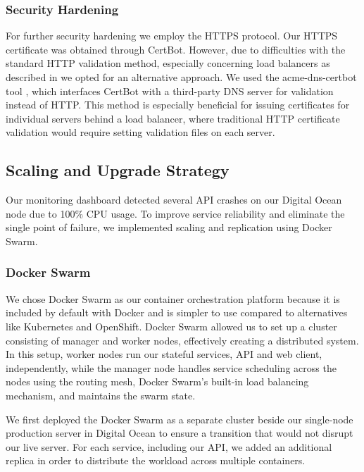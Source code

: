 \subsubsection*{Security Hardening}

For further security hardening we employ the HTTPS protocol. Our HTTPS certificate was obtained through CertBot. However, due to difficulties with the standard HTTP validation method, especially concerning load balancers as described in 
\cite{certbotDigitalOceanIssues} we opted for an alternative approach. We used the acme-dns-certbot tool \cite{acmedns}, which interfaces CertBot with a third-party DNS server for validation instead of HTTP. This method is especially beneficial for issuing certificates for individual servers behind a load balancer, where traditional HTTP certificate validation would require setting validation files on each server.

\subsection{Scaling and Upgrade Strategy}
Our monitoring dashboard detected several API crashes on our Digital Ocean node due to 100\% CPU usage. To improve service reliability and eliminate the single point of failure, we implemented scaling and replication using Docker Swarm.

\subsubsection*{Docker Swarm}
We chose Docker Swarm as our container orchestration platform because it is included by default with Docker and is simpler to use compared to alternatives like Kubernetes and OpenShift. Docker Swarm allowed us to set up a cluster consisting of manager and worker nodes, effectively creating a distributed system. In this setup, worker nodes run our stateful services, API and web client, independently, while the manager node handles service scheduling across the nodes using the routing mesh, Docker Swarm's built-in load balancing mechanism, and maintains the swarm state.

We first deployed the Docker Swarm as a separate cluster beside our single-node production server in Digital Ocean to ensure a transition that would not disrupt our live server. For each service, including our API, we added an additional replica in order to distribute the workload across multiple containers.

